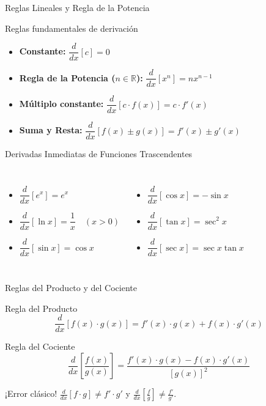 \documentclass[aspectratio=169]{beamer}
\begin{document}
\begin{frame}{Reglas Lineales y Regla de la Potencia}
  \begin{block}{Reglas fundamentales de derivación}
    \begin{itemize}
      \item \textbf{Constante:} $\dfrac{d}{dx}[c] = 0$
      \item \textbf{Regla de la Potencia ($n \in \mathbb{R}$):} $\dfrac{d}{dx}[x^n] = n x^{n-1}$
      \item \textbf{Múltiplo constante:} $\dfrac{d}{dx}[c \cdot f(x)] = c \cdot f'(x)$
      \item \textbf{Suma y Resta:} $\dfrac{d}{dx}[f(x) \pm g(x)] = f'(x) \pm g'(x)$
    \end{itemize}
  \end{block}

  \vspace{4pt}
  \begin{block}{Derivadas Inmediatas de Funciones Trascendentes}
    \begin{columns}[T]
      \begin{itemize}
        \item $\dfrac{d}{dx}[e^x] = e^x$
        \item $\dfrac{d}{dx}[\ln x] = \dfrac{1}{x} \quad (x > 0)$
        \item $\dfrac{d}{dx}[\sin x] = \cos x$
      \end{itemize}
      \begin{itemize}
        \item $\dfrac{d}{dx}[\cos x] = -\sin x$
        \item $\dfrac{d}{dx}[\tan x] = \sec^2 x$
        \item $\dfrac{d}{dx}[\sec x] = \sec x \tan x$
      \end{itemize}
    \end{columns}
  \end{block}
\end{frame}

\begin{frame}{Reglas del Producto y del Cociente}
  \begin{block}{Regla del Producto}
    $$\boxed{\frac{d}{dx}[f(x) \cdot g(x)] = f'(x) \cdot g(x) + f(x) \cdot g'(x)}$$
  \end{block}

  \vspace{4pt}
  \begin{block}{Regla del Cociente}
    $$\boxed{\frac{d}{dx}\left[\frac{f(x)}{g(x)}\right] = \frac{f'(x) \cdot g(x) - f(x) \cdot g'(x)}{[g(x)]^2}}$$
  \end{block}

  \vspace{4pt}
  \begin{alertblock}{¡Error clásico!}
    $\frac{d}{dx}[f \cdot g] \neq f' \cdot g'$ \qquad y \qquad $\frac{d}{dx}\left[\frac{f}{g}\right] \neq \frac{f'}{g'}$.
  \end{alertblock}
\end{frame}
\end{document}
